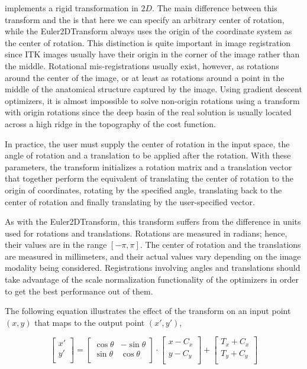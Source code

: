  implements a rigid transformation in $2D$.
The main difference between this transform and the 
is that here we can specify an arbitrary center of rotation, while the
Euler2DTransform always uses the origin of the coordinate system as the center
of rotation. This distinction is quite important in image registration since
ITK images usually have their origin in the corner of the image rather than the
middle.  Rotational mis-registrations usually exist, however, as rotations
around the center of the image, or at least as rotations around a point in the
middle of the anatomical structure captured by the image. Using gradient
descent optimizers, it is almost impossible to solve non-origin rotations using
a transform with origin rotations since the deep basin of the real solution is
usually located across a high ridge in the topography of the cost function.

In practice, the user must supply the center of rotation in the input space,
the angle of rotation and a translation to be applied after the rotation. With
these parameters, the transform initializes a rotation matrix and a translation
vector that together perform the equivalent of translating the center of
rotation to the origin of coordinates, rotating by the specified angle,
translating back to the center of rotation and finally translating by the
user-specified vector.

As with the Euler2DTransform, this transform suffers from the difference in
units used for rotations and translations. Rotations are measured in radians;
hence, their values are in the range $[-\pi,\pi]$. The center of rotation and
the translations are measured in millimeters, and their actual values vary
depending on the image modality being considered.  Registrations involving
angles and translations should take advantage of the scale normalization
functionality of the optimizers in order to get the best performance out of
them.

The following equation illustrates the effect of the transform on an input
point $(x,y)$ that maps to the output point $(x',y')$,

\begin{equation}
\left[ 
\begin{array}{c}
x' \\
y' \\
\end{array}
\right]
=
\left[ 
\begin{array}{cc}
\cos{\theta} & -\sin{\theta} \\
\sin{\theta} &  \cos{\theta} \\
\end{array}
\right]
\cdot
\left[ 
\begin{array}{c}
x - C_x \\
y - C_y \\
\end{array}
\right]
+ 
\left[ 
\begin{array}{c}
T_x + C_x \\
T_y + C_y \\
\end{array}
\right]
\end{equation}

